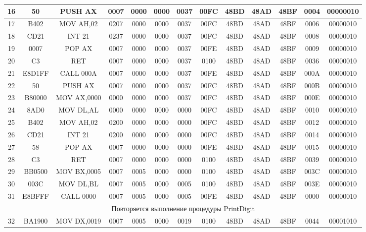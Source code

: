 \begin{tabular}{|c|c|c|c|c|c|c|c|c|c|c|c|c|}
\hline
	16 & 50 & PUSH AX & 0007 & 0000 & 0000 & 0037 & 00FC & 48BD & 48AD & 48BF & 0004 & 00000010 \\
\hline
	17 & B402 & MOV AH,02 & 0207 & 0000 & 0000 & 0037 & 00FC & 48BD & 48AD & 48BF & 0006 & 00000010 \\
\hline
	18 & CD21 & INT 21 & 0237 & 0000 & 0000 & 0037 & 00FC & 48BD & 48AD & 48BF & 0008 & 00000010 \\
\hline
	19 & 0007 & POP AX & 0007 & 0000 & 0000 & 0037 & 00FE & 48BD & 48AD & 48BF & 0009 & 00000010 \\
\hline
	20 & C3 & RET & 0007 & 0000 & 0000 & 0037 & 0100 & 48BD & 48AD & 48BF & 0036 & 00000010 \\
\hline
	21 & E8D1FF & CALL 000A & 0007 & 0000 & 0000 & 0037 & 00FE & 48BD & 48AD & 48BF & 000A & 00000010 \\
\hline
	22 & 50 & PUSH AX & 0007 & 0000 & 0000 & 0037 & 00FC & 48BD & 48AD & 48BF & 000B & 00000010 \\
\hline
	23 & B80000 & MOV AX,0000 & 0000 & 0000 & 0000 & 0037 & 00FC & 48BD & 48AD & 48BF & 000E & 00000010 \\
\hline
	24 & 8AD0 & MOV DL,AL & 0000 & 0000 & 0000 & 0000 & 00FC & 48BD & 48AD & 48BF & 0010 & 00000010 \\
\hline
	25 & B402 & MOV AH,02 & 0200 & 0000 & 0000 & 0000 & 00FC & 48BD & 48AD & 48BF & 0012 & 00000010 \\
\hline
	26 & CD21 & INT 21 & 0200 & 0000 & 0000 & 0000 & 00FC & 48BD & 48AD & 48BF & 0014 & 00000010 \\
\hline
	27 & 58 & POP AX & 0007 & 0000 & 0000 & 0000 & 00FE & 48BD & 48AD & 48BF & 0015 & 00000010 \\
\hline
	28 & C3 & RET & 0007 & 0000 & 0000 & 0000 & 0100 & 48BD & 48AD & 48BF & 0039 & 00000010 \\
\hline
 	29 & BB0500 & MOV BX,0005 & 0007 & 0005 & 0000 & 0000 & 0100 & 48BD & 48AD & 48BF & 003C & 00000010 \\
\hline
	30 & 003C & MOV DL,BL & 0007 & 0005 & 0000 & 0005 & 0100 & 48BD & 48AD & 48BF & 003E & 00000010 \\
\hline
	31 & E8BFFF & CALL 0000 & 0007 & 0005 & 0000 & 0005 & 00FE & 48BD & 48AD & 48BF & 0000 & 00000010 \\
\hline
	\multicolumn{13}{|c|}{Повторяется выполнение процедуры PrintDigit} \\
\hline
	32 & BA1900 & MOV DX,0019 & 0007 & 0005 & 0000 & 0019 & 0100 & 48BD & 48AD & 48BF & 0044 & 00001010 \\
\hline

\end{tabular}
